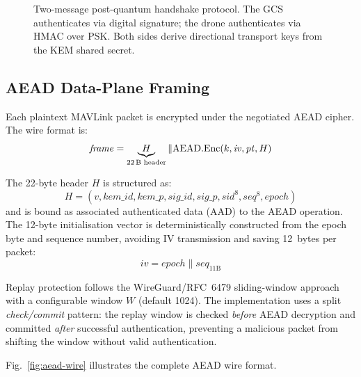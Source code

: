 \documentclass[conference]{IEEEtran}
\begin{document}
\begin{figure}[t]
{%
    }%
    \caption{Two-message post-quantum handshake protocol. The GCS authenticates via digital signature; the drone authenticates via HMAC over PSK. Both sides derive directional transport keys from the KEM shared secret.}
    \label{fig:handshake}
\end{figure}

\subsection{AEAD Data-Plane Framing}

Each plaintext MAVLink packet is encrypted under the negotiated AEAD cipher.
The wire format is:
\begin{equation}
    \mathit{frame} = \underbrace{H}_{\text{22\,B header}} \mathbin\| \mathrm{AEAD.Enc}(k, \mathit{iv}, \mathit{pt}, H)
\end{equation}

The 22-byte header $H$ is structured as:
\[
H = (v, \mathit{kem\_id}, \mathit{kem\_p}, \mathit{sig\_id}, \mathit{sig\_p}, \mathit{sid}^{8}, \mathit{seq}^{8}, \mathit{epoch})
\]
and is bound as associated authenticated data (AAD) to the AEAD operation.
The 12-byte initialisation vector is deterministically constructed from the epoch byte and sequence number, avoiding IV transmission and saving 12~bytes per packet:
\begin{equation}
    \mathit{iv} = \mathit{epoch} \mathbin\| \mathit{seq}_{11\text{B}}
\end{equation}

Replay protection follows the WireGuard/RFC~6479 sliding-window approach with a configurable window $W$ (default 1024).
The implementation uses a split \emph{check/commit} pattern: the replay window is checked \emph{before} AEAD decryption and committed \emph{after} successful authentication, preventing a malicious packet from shifting the window without valid authentication.

Fig.~\ref{fig:aead-wire} illustrates the complete AEAD wire format.
\end{document}
